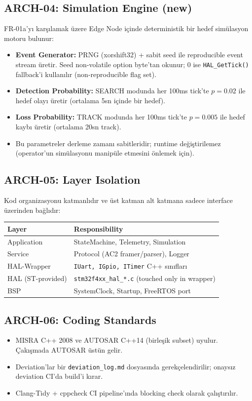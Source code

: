 \subsection{ARCH-04: Simulation Engine (new)}
FR-01a'yı karşılamak üzere Edge Node içinde deterministik bir hedef simülasyon motoru bulunur:
\begin{itemize}
    \item \textbf{Event Generator:} PRNG (xorshift32) + sabit seed ile reproducible event stream üretir. Seed non-volatile option byte'tan okunur; 0 ise \texttt{HAL\_GetTick()} fallback'i kullanılır (non-reproducible flag set).
    \item \textbf{Detection Probability:} SEARCH modunda her 100ms tick'te $p=0.02$ ile hedef olayı üretir (ortalama 5sn içinde bir hedef).
    \item \textbf{Loss Probability:} TRACK modunda her 100ms tick'te $p=0.005$ ile hedef kaybı üretir (ortalama 20sn track).
    \item Bu parametreler derleme zamanı sabitleridir; runtime değiştirilemez (operator'un simülasyonu manipüle etmesini önlemek için).
\end{itemize}

\subsection{ARCH-05: Layer Isolation}
Kod organizasyonu katmanlıdır ve üst katman alt katmana sadece interface üzerinden bağlıdır:
\begin{center}
\begin{tabular}{|l|l|}
\hline
\textbf{Layer} & \textbf{Responsibility} \\
\hline
Application   & StateMachine, Telemetry, Simulation \\
Service       & Protocol (AC2 framer/parser), Logger \\
HAL-Wrapper   & \texttt{IUart, IGpio, ITimer} C++ sınıfları \\
HAL (ST-provided) & \texttt{stm32f4xx\_hal\_*.c} (touched only in wrapper) \\
BSP           & SystemClock, Startup, FreeRTOS port \\
\hline
\end{tabular}
\end{center}

\subsection{ARCH-06: Coding Standards}
\begin{itemize}
    \item MISRA C++ 2008 ve AUTOSAR C++14 (birleşik subset) uyulur. Çakışmada AUTOSAR üstün gelir.
    \item Deviation'lar bir \texttt{deviation\_log.md} dosyasında gerekçelendirilir; onaysız deviation CI'da build'i kırar.
    \item Clang-Tidy + cppcheck CI pipeline'ında blocking check olarak çalıştırılır.
\end{itemize}
